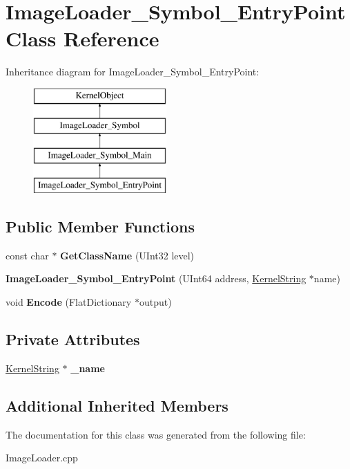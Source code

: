 \hypertarget{class_image_loader___symbol___entry_point}{}\section{Image\+Loader\+\_\+\+Symbol\+\_\+\+Entry\+Point Class Reference}
\label{class_image_loader___symbol___entry_point}
Inheritance diagram for Image\+Loader\+\_\+\+Symbol\+\_\+\+Entry\+Point\+:\begin{figure}[H]
\begin{center}
\leavevmode
\includegraphics[height=4.000000cm]{class_image_loader___symbol___entry_point}
\end{center}
\end{figure}
\subsection*{Public Member Functions}
\begin{DoxyCompactItemize}
\item 
\mbox{\label{class_image_loader___symbol___entry_point_aabd13b5bdf106c5b76257b86bda80ef9}} 
const char $\ast$ {\bfseries Get\+Class\+Name} (U\+Int32 level)
\item 
\mbox{\label{class_image_loader___symbol___entry_point_a7aef7b9543ebecdd3247d7569a4cf09c}} 
{\bfseries Image\+Loader\+\_\+\+Symbol\+\_\+\+Entry\+Point} (U\+Int64 address, \hyperlink{class_kernel_string}{Kernel\+String} $\ast$name)
\item 
\mbox{\label{class_image_loader___symbol___entry_point_a3c3e934d2241d7c44013c2fa3938ecc4}} 
void {\bfseries Encode} (Flat\+Dictionary $\ast$output)
\end{DoxyCompactItemize}
\subsection*{Private Attributes}
\begin{DoxyCompactItemize}
\item 
\mbox{\label{class_image_loader___symbol___entry_point_a9139121e368b8bd58a7b16cd1d4caefc}} 
\hyperlink{class_kernel_string}{Kernel\+String} $\ast$ {\bfseries \+\_\+name}
\end{DoxyCompactItemize}
\subsection*{Additional Inherited Members}


The documentation for this class was generated from the following file\+:\begin{DoxyCompactItemize}
\item 
Image\+Loader.\+cpp\end{DoxyCompactItemize}
